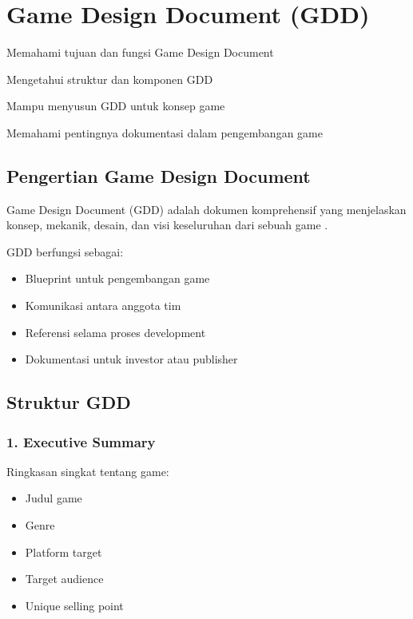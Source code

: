 
\section{Game Design Document (GDD)}

\begin{learningoutcomes}
\item Memahami tujuan dan fungsi Game Design Document
\item Mengetahui struktur dan komponen GDD
\item Mampu menyusun GDD untuk konsep game
\item Memahami pentingnya dokumentasi dalam pengembangan game
\end{learningoutcomes}

\subsection{Pengertian Game Design Document}

\begin{definisi}
Game Design Document (GDD) adalah dokumen komprehensif yang menjelaskan konsep, mekanik, desain, dan visi keseluruhan dari sebuah game \cite{Schell2019}.
\end{definisi}

GDD berfungsi sebagai:
\begin{itemize}
\item Blueprint untuk pengembangan game
\item Komunikasi antara anggota tim
\item Referensi selama proses development
\item Dokumentasi untuk investor atau publisher
\end{itemize}

\subsection{Struktur GDD}

\subsubsection{1. Executive Summary}
Ringkasan singkat tentang game:
\begin{itemize}
\item Judul game
\item Genre
\item Platform target
\item Target audience
\item Unique selling point
\end{itemize}

